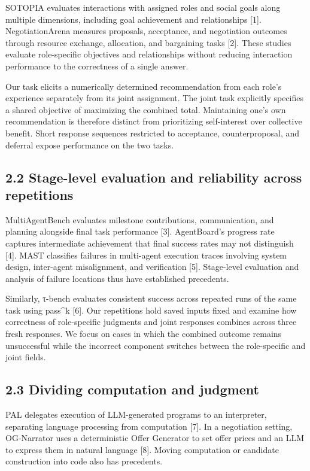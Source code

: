 \documentclass[10pt,a4paper]{article}
\begin{document}
SOTOPIA evaluates interactions with assigned roles and social goals along multiple dimensions, including goal achievement and relationships {[}1{]}. NegotiationArena measures proposals, acceptance, and negotiation outcomes through resource exchange, allocation, and bargaining tasks {[}2{]}. These studies evaluate role-specific objectives and relationships without reducing interaction performance to the correctness of a single answer.

Our task elicits a numerically determined recommendation from each role's experience separately from its joint assignment. The joint task explicitly specifies a shared objective of maximizing the combined total. Maintaining one's own recommendation is therefore distinct from prioritizing self-interest over collective benefit. Short response sequences restricted to acceptance, counterproposal, and deferral expose performance on the two tasks.

\subsection{2.2 Stage-level evaluation and reliability across repetitions}\label{paper-03-stage-level-evaluation-and-reliability-across-repetitions}

MultiAgentBench evaluates milestone contributions, communication, and planning alongside final task performance {[}3{]}. AgentBoard's progress rate captures intermediate achievement that final success rates may not distinguish {[}4{]}. MAST classifies failures in multi-agent execution traces involving system design, inter-agent misalignment, and verification {[}5{]}. Stage-level evaluation and analysis of failure locations thus have established precedents.

Similarly, τ-bench evaluates consistent success across repeated runs of the same task using pass\^{}k {[}6{]}. Our repetitions hold saved inputs fixed and examine how correctness of role-specific judgments and joint responses combines across three fresh responses. We focus on cases in which the combined outcome remains unsuccessful while the incorrect component switches between the role-specific and joint fields.

\subsection{2.3 Dividing computation and judgment}\label{paper-03-dividing-computation-and-judgment}

PAL delegates execution of LLM-generated programs to an interpreter, separating language processing from computation {[}7{]}. In a negotiation setting, OG-Narrator uses a deterministic Offer Generator to set offer prices and an LLM to express them in natural language {[}8{]}. Moving computation or candidate construction into code also has precedents.
\end{document}
